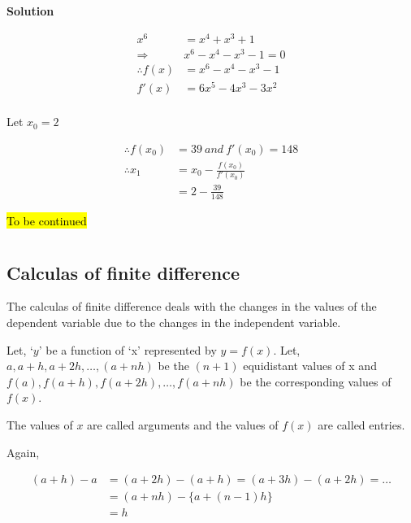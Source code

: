 \documentclass[11pt, a4paper, oneside]{book}
\begin{document}
\begin{enumerate}
                  \textbf{Solution}

                  \begin{align*}
                    x^6&=x^4+x^3+1\\
                    \Rightarrow &x^6-x^4-x^3-1=0\\
                    \therefore f(x)&=x^6-x^4-x^3-1\\
                    f'(x)&=6x^5-4x^3-3x^2\\
                  \end{align*}

                    Let $x_0=2$

                  \begin{align*}
                    \therefore f(x_0)&=39\ and\ f'(x_0)=148\\
                    \therefore x_1&=x_0-\frac{f(x_0)}{f'(x_0)}\\
                    &=2-\frac{39}{148}
                  \end{align*}

                  \hl{To be continued}
              \end{enumerate}




      \chapter{}
       \section{Calculas of finite difference}
         The calculas of finite difference deals with the changes in the values of the
         dependent variable due to the changes in the independent variable.

         Let, `$y$' be a function of `x' represented by $y=f(x)$. Let, $a,a+h,a+2h,
         \dots,(a+nh)$ be the $(n+1)$ equidistant values of x and
         $f(a),f(a+h),f(a+2h),\dots,f(a+nh)$ be the corresponding values of $f(x)$.

         The values of $x$ are called arguments and the values of $f(x)$ are called
         entries.

         Again,

         \begin{align*}
           (a+h)-a&=(a+2h)-(a+h)=(a+3h)-(a+2h)=\dots\\
           &=(a+nh)-\{a+(n-1)h\}\\
           &=h
         \end{align*}
\end{document}
